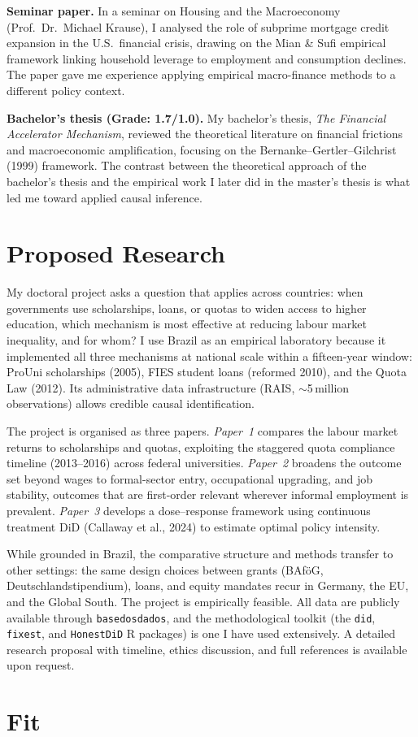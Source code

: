 \documentclass[a4paper,11pt]{article}
\begin{document}
\textbf{Seminar paper.} In a seminar on Housing and the Macroeconomy (Prof.\ Dr.\ Michael Krause), I analysed the role of subprime mortgage credit expansion in the U.S.\ financial crisis, drawing on the Mian \& Sufi empirical framework linking household leverage to employment and consumption declines. The paper gave me experience applying empirical macro-finance methods to a different policy context.

\textbf{Bachelor's thesis (Grade: 1.7/1.0).} My bachelor's thesis, \textit{The Financial Accelerator Mechanism}, reviewed the theoretical literature on financial frictions and macroeconomic amplification, focusing on the Bernanke--Gertler--Gilchrist (1999) framework. The contrast between the theoretical approach of the bachelor's thesis and the empirical work I later did in the master's thesis is what led me toward applied causal inference.

\section*{Proposed Research}

My doctoral project asks a question that applies across countries: when governments use scholarships, loans, or quotas to widen access to higher education, which mechanism is most effective at reducing labour market inequality, and for whom? I use Brazil as an empirical laboratory because it implemented all three mechanisms at national scale within a fifteen-year window: ProUni scholarships (2005), FIES student loans (reformed 2010), and the Quota Law (2012). Its administrative data infrastructure (RAIS, $\sim$5\,million observations) allows credible causal identification.

The project is organised as three papers. \textit{Paper~1} compares the labour market returns to scholarships and quotas, exploiting the staggered quota compliance timeline (2013--2016) across federal universities. \textit{Paper~2} broadens the outcome set beyond wages to formal-sector entry, occupational upgrading, and job stability, outcomes that are first-order relevant wherever informal employment is prevalent. \textit{Paper~3} develops a dose--response framework using continuous treatment DiD (Callaway et al., 2024) to estimate optimal policy intensity.

While grounded in Brazil, the comparative structure and methods transfer to other settings: the same design choices between grants (BAf\"oG, Deutschlandstipendium), loans, and equity mandates recur in Germany, the EU, and the Global South. The project is empirically feasible. All data are publicly available through \texttt{basedosdados}, and the methodological toolkit (the \texttt{did}, \texttt{fixest}, and \texttt{HonestDiD} R packages) is one I have used extensively. A detailed research proposal with timeline, ethics discussion, and full references is available upon request.

\section*{Fit}

\end{document}
